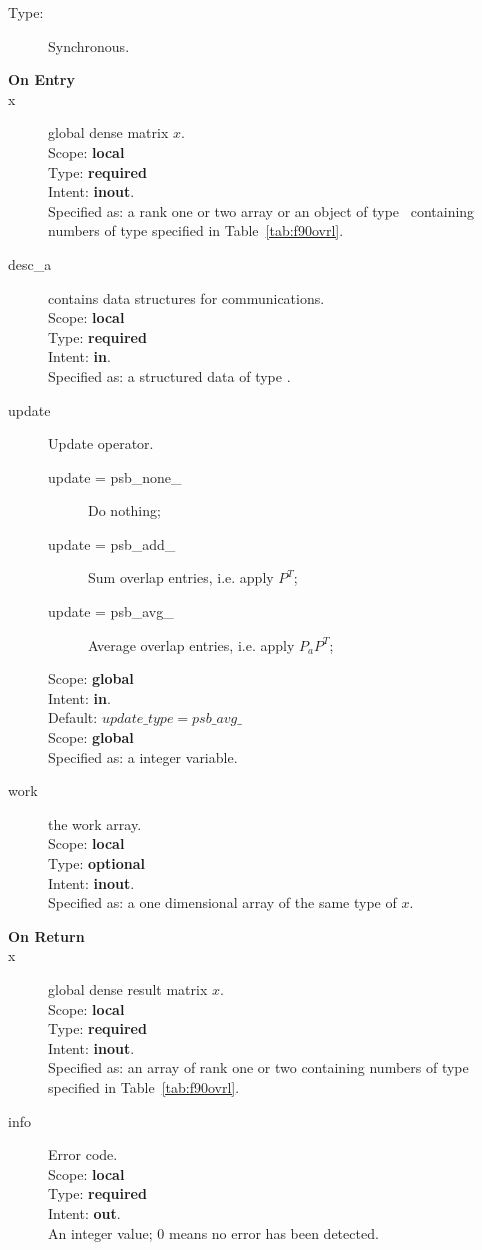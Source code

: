 \begin{description}
\item[Type:] Synchronous.
\item[\bf On Entry]
\item[x] global dense matrix $x$.\\
Scope: {\bf local} \\
Type: {\bf required} \\
Intent: {\bf inout}.\\
Specified as:  a rank one or two array or an object of type \vdata\ 
containing numbers of type specified in
Table~\ref{tab:f90ovrl}.
\item[desc\_a] contains data structures for communications.\\
Scope: {\bf local} \\
Type: {\bf required}\\
Intent: {\bf in}.\\
Specified as: a structured data of type \descdata.
\item[update] Update operator. \\
\begin{description}
\item[update = psb\_none\_] Do nothing;
\item[update = psb\_add\_] Sum overlap entries, i.e. apply $P^T$;
\item[update = psb\_avg\_] Average overlap entries, i.e. apply $P_aP^T$;
\end{description}
Scope: {\bf global} \\
Intent: {\bf in}.\\
Default: $update\_type = psb\_avg\_ $\\	
Scope: {\bf global} \\
Specified as: a integer variable.
\item[work] the work array. \\
Scope: {\bf local} \\
Type: {\bf optional}\\
Intent: {\bf inout}.\\
Specified as: a one dimensional array of the same type of $x$.

\item[\bf On Return] 
\item[x] global dense result matrix $x$.\\
Scope: {\bf local} \\
Type: {\bf required} \\
Intent: {\bf inout}.\\
Specified as: an  array of rank one or two
containing numbers of type specified in
Table~\ref{tab:f90ovrl}.
\item[info] Error code.\\
Scope: {\bf local} \\
Type: {\bf required} \\
Intent: {\bf out}.\\
An integer value; 0 means no error has been detected. 
\end{description}


